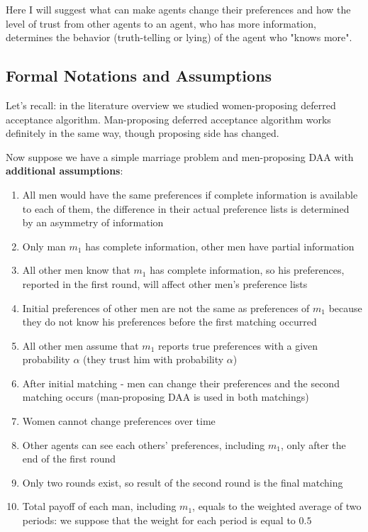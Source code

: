 \documentclass[a4paper]{article} %
\begin{document}
\hfill
\break
Here I will suggest what can make agents change their preferences and how the level of trust from other agents to an agent, who has more information, determines the behavior (truth-telling or lying) of the agent who "knows more".







\subsection{Formal Notations and Assumptions}
Let's recall: in the literature overview we studied women-proposing deferred acceptance algorithm. Man-proposing deferred acceptance algorithm works definitely in the same way, though proposing side has changed.

\hfill 
\break
Now suppose we have a simple marriage problem and men-proposing DAA with \textbf{additional assumptions}:
\begin{enumerate}
    \item All men would have the same preferences if complete information is available to each of them, the difference in their actual preference lists is determined by an asymmetry of information
    \item Only man $m_1$ has complete information, other men have partial information
    \item All other men know that $m_1$ has complete information, so his preferences, reported in the first round, will affect other men's preference lists
    \item Initial preferences of other men are not the same as preferences of $m_1$ because they do not know his preferences before the first matching occurred
    \item All other men assume that $m_1$ reports true preferences with a given probability $\alpha$ (they trust him with probability $\alpha$)
    \item After initial matching - men can change their preferences and the second matching occurs (man-proposing DAA is used in both matchings)
    \item Women cannot change preferences over time
    \item Other agents can see each others' preferences, including $m_1$, only after the end of the first round
    \item Only two rounds exist, so result of the second round is the final matching
    \item Total payoff of each man, including $m_1$, equals to the weighted average of two periods: we suppose that the weight for each period is equal to $0.5$
\end{enumerate}
\end{document}
